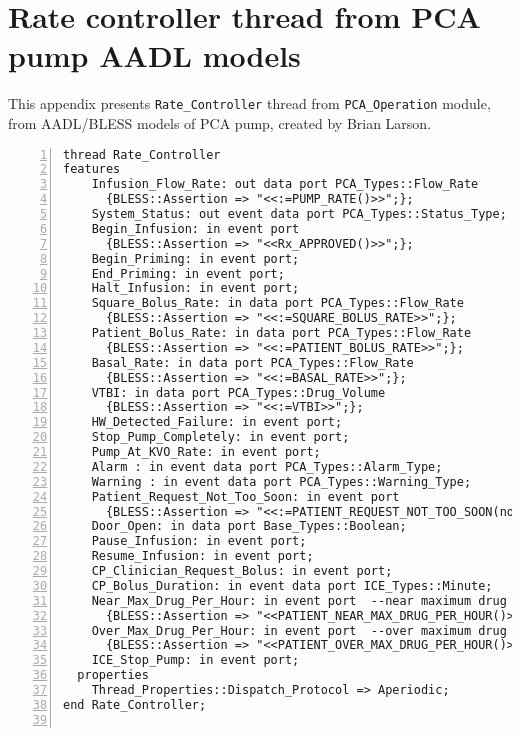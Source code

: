 
\cleardoublepage

\chapter{Rate controller thread from PCA pump AADL models}
\label{Appendix:AADL:RateController}

This appendix presents \lstinline{Rate_Controller} thread from \lstinline{PCA_Operation} module, from AADL/BLESS models of PCA pump, created by Brian Larson.

\singlespacing
\begin{lstlisting}[language=aadl, gobble=0, numbers=left, caption={\lstinline{Rate_Controller} thread}, label={listing:aadl:rate_controller_thread}]
thread Rate_Controller
features
    Infusion_Flow_Rate: out data port PCA_Types::Flow_Rate
      {BLESS::Assertion => "<<:=PUMP_RATE()>>";};   
    System_Status: out event data port PCA_Types::Status_Type;
    Begin_Infusion: in event port
      {BLESS::Assertion => "<<Rx_APPROVED()>>";};  
    Begin_Priming: in event port;
    End_Priming: in event port;
    Halt_Infusion: in event port;
    Square_Bolus_Rate: in data port PCA_Types::Flow_Rate 
      {BLESS::Assertion => "<<:=SQUARE_BOLUS_RATE>>";};
    Patient_Bolus_Rate: in data port PCA_Types::Flow_Rate 
      {BLESS::Assertion => "<<:=PATIENT_BOLUS_RATE>>";};
    Basal_Rate: in data port PCA_Types::Flow_Rate 
      {BLESS::Assertion => "<<:=BASAL_RATE>>";};
    VTBI: in data port PCA_Types::Drug_Volume 
      {BLESS::Assertion => "<<:=VTBI>>";};
    HW_Detected_Failure: in event port;
    Stop_Pump_Completely: in event port; 
    Pump_At_KVO_Rate: in event port; 
    Alarm : in event data port PCA_Types::Alarm_Type;
    Warning : in event data port PCA_Types::Warning_Type;
    Patient_Request_Not_Too_Soon: in event port 
      {BLESS::Assertion => "<<:=PATIENT_REQUEST_NOT_TOO_SOON(now)>>";};  
    Door_Open: in data port Base_Types::Boolean;
    Pause_Infusion: in event port;
    Resume_Infusion: in event port;
    CP_Clinician_Request_Bolus: in event port;
    CP_Bolus_Duration: in event data port ICE_Types::Minute; 
    Near_Max_Drug_Per_Hour: in event port  --near maximum drug infused in any hour
      {BLESS::Assertion => "<<PATIENT_NEAR_MAX_DRUG_PER_HOUR()>>";};  
    Over_Max_Drug_Per_Hour: in event port  --over maximum drug infused in any hour
      {BLESS::Assertion => "<<PATIENT_OVER_MAX_DRUG_PER_HOUR()>>";};  
    ICE_Stop_Pump: in event port;
  properties
    Thread_Properties::Dispatch_Protocol => Aperiodic;
end Rate_Controller;


\end{lstlisting}
